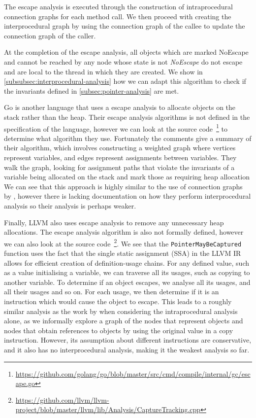 \documentclass{proposal}
\begin{document}
    The escape analysis is executed through the construction of intraprocedural connection graphs for each method call.
    We then proceed with creating the interprocedural graph by using the connection graph of the callee to update the connection graph of the caller.

    At the completion of the escape analysis, all objects which are marked NoEscape and cannot be reached by any node whose state is not \emph{NoEscape} do not escape and are local to the thread in which they are created.
    We show in \autoref{subsubsec:interprocedural-analysis} how we can adapt this algorithm to check if the invariants defined in \autoref{subsec:pointer-analysis} are met.

    Go is another language that uses a escape analysis to allocate objects on the stack rather than the heap.
    Their escape analysis algorithms is not defined in the specification of the language, however we can look at the source code~\footnote{\url{https://github.com/golang/go/blob/master/src/cmd/compile/internal/gc/escape.go}} to determine what algorithm they use.
    Fortunately the comments give a summary of their algorithm, which involves constructing a weighted graph where vertices represent variables, and edges represent assignments between variables.
    They walk the graph, looking for assignment paths that violate the invariants of a variable being allocated on the stack and mark those as requiring heap allocation
    We can see that this approach is highly similar to the use of connection graphs by \citet{Choi1999}, however there is lacking documentation on how they perform interprocedural analysis so their analysis is perhaps weaker.

    Finally, LLVM also uses escape analysis to remove any unnecessary heap allocations.
    The escape analysis algorithm is also not formally defined, however we can also look at the source code~\footnote{\url{https://github.com/llvm/llvm-project/blob/master/llvm/lib/Analysis/CaptureTracking.cpp}}.
    We see that the \texttt{PointerMayBeCaptured} function uses the fact that the single static assignment (SSA) in the LLVM IR allows for efficient creation of definition-usage chains.
    For any defined value, such as a value initialising a variable, we can traverse all its usages, such as copying to another variable.
    To determine if an object escapes, we analyse all its usages, and all their usages and so on.
    For each usage, we then determine if it is an instruction which would cause the object to escape.
    This leads to a roughly similar analysis as the work by \citet{Choi1999} when considering the intraprocedural analysis alone, as we informally explore a graph of the nodes that represent objects and nodes that obtain references to objects by using the original value in a copy instruction.
    However, its assumption about different instructions are conservative, and it also has no interprocedural analysis, making it the weakest analysis so far.
\end{document}

